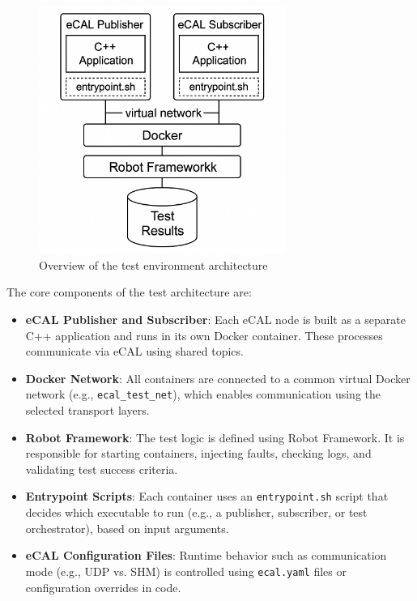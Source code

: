  \begin{figure}[H]
 	\centering
 	\includegraphics[width=0.72\textwidth]{Images/test_architecture_diagram.png}
 	\caption{Overview of the test environment architecture}
 	\label{fig:test_architecture_diagram}
 \end{figure}
 
The core components of the test architecture are:

\begin{itemize}
	\item \textbf{eCAL Publisher and Subscriber}: Each eCAL node is built as a separate C++ application and runs in its own Docker container. These processes communicate via eCAL using shared topics.
	\item \textbf{Docker Network}: All containers are connected to a common virtual Docker network (e.g., \texttt{ecal\_test\_net}), which enables communication using the selected transport layers.
	\item \textbf{Robot Framework}: The test logic is defined using Robot Framework. It is responsible for starting containers, injecting faults, checking logs, and validating test success criteria.
	\item \textbf{Entrypoint Scripts}: Each container uses an \texttt{entrypoint.sh} script that decides which executable to run (e.g., a publisher, subscriber, or test orchestrator), based on input arguments.
	\item \textbf{eCAL Configuration Files}: Runtime behavior such as communication mode (e.g., UDP vs. SHM) is controlled using \texttt{ecal.yaml} files or configuration overrides in code.
\end{itemize}

